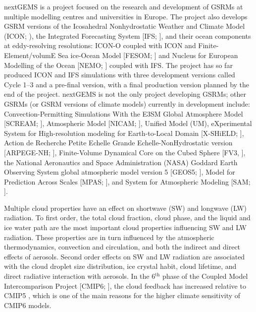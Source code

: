 \documentclass[12pt,a4paper]{article}
\begin{document}
nextGEMS is a project \citep{nextgems} focused on the
research and development of GSRMs at multiple modelling centres and
universities in Europe.  The project also develops GSRM versions of the
Icosahedral Nonhydrostatic Weather and Climate Model (ICON; \cite{hohenegger2023}), the Integrated
Forecasting System [IFS; \cite{ifs2023}], and their ocean components at eddy-resolving
resolutions: ICON-O \citep{korn2022} coupled with ICON and Finite-Element/volumE Sea ice-Ocean
Model [FESOM; \cite{wang2014}] and Nucleus for European Modelling of the Ocean [NEMO; \cite{madec2023}] coupled
with IFS.  The project has so far produced ICON and IFS simulations with three
development versions called Cycle 1--3 and a pre-final version, with a final production
version planned by the end of the project. nextGEMS is not the only project
developing GSRMs; other GSRMs (or GSRM versions of climate models) currently in
development include: Convection-Permitting Simulations With the E3SM Global
Atmosphere Model [SCREAM; \cite{caldwell2021}], Atmospheric Model [NICAM;
\cite{satoh2008}], Unified Model (UM), eXperimental System for High-resolution
modeling for Earth-to-Local Domain [X-SHiELD; \cite{shield}], Action de
Recherche Petite Echelle Grande Echelle-NonHydrostatic version [ARPEGE-NH;
\cite{bubnova1995,voldoire2017}], Finite-Volume Dynamical Core on the Cubed
Sphere [FV3, \cite{lin2004}], the National Aeronautics and Space Administration
(NASA) Goddard Earth Observing System global atmospheric model version 5
[GEOS5; \cite{putman2011}], Model for Prediction Across Scales [MPAS;
\cite{skamarock2012}], and System for Atmospheric Modeling [SAM;
\cite{khairoutdinov2003}].

Multiple cloud properties have an effect on shortwave (SW) and longwave (LW)
radiation. To first order, the total cloud fraction, cloud phase, and the
liquid and ice water path are the most important cloud properties influencing
SW and LW radiation. These properties are  in turn influenced by the
atmospheric thermodynamics, convection and circulation, and both the indirect and direct
effects of aerosols. Second order effects on SW and LW radiation are associated
with the cloud droplet size distribution, ice crystal habit, cloud lifetime,
and direct radiative interaction with aerosols.  In the 6$^\mathrm{th}$ phase
of the Coupled Model Intercomparison Project [CMIP6; \cite{eyring2016}], the
cloud feedback has increased relative to CMIP5 \citep{zelinka2020}, which is
one of the main reasons for the higher climate sensitivity of CMIP6 models.
\end{document}

